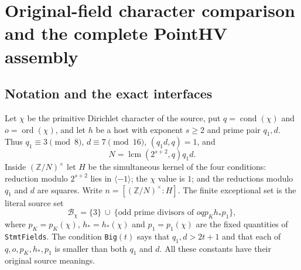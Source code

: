 \section{Original-field character comparison and the complete PointHV assembly}
\label{sec:point-hv-assembly}


\subsection{Notation and the exact interfaces}

Let $\chi$ be the primitive Dirichlet character of the source, put
$q=\operatorname{cond}(\chi)$ and $o=\operatorname{ord}(\chi)$,
and let $h$ be a host with exponent $s\ge2$ and prime pair $q_1,d$.
Thus $q_1\equiv3\pmod8$, $d\equiv7\pmod{16}$,
$(q_1d,q)=1$, and
\[
 N=\operatorname{lcm}(2^{s+2},q)q_1d.
 \tag{HV.1}
\]
Inside $(\mathbb Z/N)^\times$ let $H$ be the simultaneous kernel
of the four conditions: reduction modulo $2^{s+2}$ lies in
$\langle-1\rangle$; the $\chi$ value is $1$; and the reductions
modulo $q_1$ and $d$ are squares.  Write $n=[(\mathbb Z/N)^\times:H]$.
The finite exceptional set is the literal source set
\[
 \mathcal B_\chi=\{3\}\ \cup\
 \{\text{odd prime divisors of }o q p_K h_* p_1\},
 \tag{HV.2}
\]
where $p_K=p_K(\chi)$, $h_*=h_*(\chi)$ and $p_1=p_1(\chi)$
are the fixed quantities of \texttt{StmtFields}.
The condition \texttt{Big}$(t)$ says that $q_1,d>2t+1$ and that
each of $q,o,p_K,h_*,p_1$ is smaller than both $q_1$ and $d$.
All these constants have their original source meanings.

